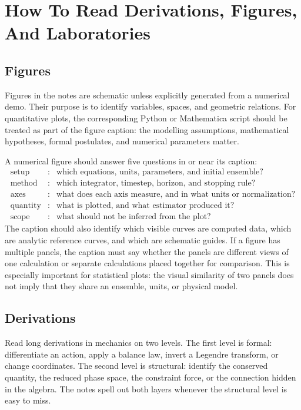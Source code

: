 \section{How To Read Derivations, Figures, And Laboratories}
\label{sec:how-to-read}

\subsection*{Figures}
\label{sec:read-figures}

Figures in the notes are schematic unless explicitly generated from a numerical
demo. Their purpose is to identify variables, spaces, and geometric relations.
For quantitative plots, the corresponding Python or Mathematica script should be
treated as part of the figure caption: the modelling assumptions, mathematical
hypotheses, formal postulates, and numerical parameters matter.

A numerical figure should answer five questions in or near its caption:
\[
\begin{array}{rcl}
\text{setup} &:& \text{which equations, units, parameters, and initial ensemble?}\\
\text{method} &:& \text{which integrator, timestep, horizon, and stopping rule?}\\
\text{axes} &:& \text{what does each axis measure, and in what units or normalization?}\\
\text{quantity} &:& \text{what is plotted, and what estimator produced it?}\\
\text{scope} &:& \text{what should not be inferred from the plot?}
\end{array}
\]
The caption should also identify which visible curves are computed data, which
are analytic reference curves, and which are schematic guides. If a figure has
multiple panels, the caption must say whether the panels are different views of
one calculation or separate calculations placed together for comparison.  This
is especially important for statistical plots: the visual similarity of two
panels does not imply that they share an ensemble, units, or physical model.

\subsection*{Derivations}
\label{sec:read-long-derivations}

Read long derivations in mechanics on two levels. The first level is formal:
differentiate an action, apply a balance law, invert a Legendre
transform, or change coordinates. The second level is structural: identify the
conserved quantity, the reduced phase space, the constraint force, or the
connection hidden in the algebra. The notes spell out both layers whenever the
structural level is easy to miss.

